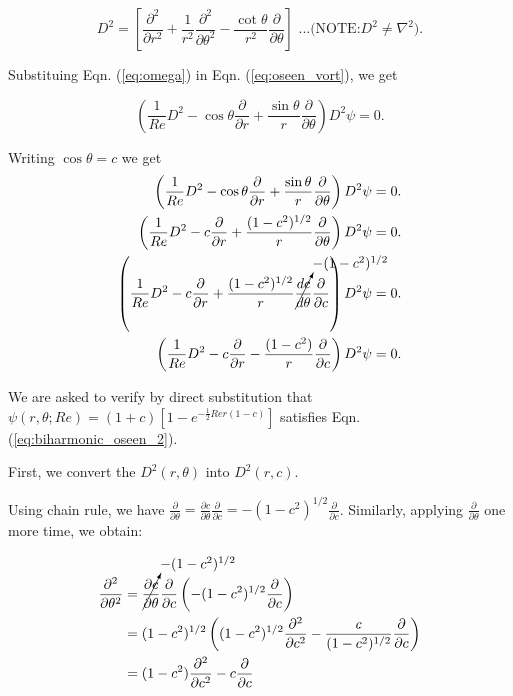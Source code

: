 \documentclass{article}
\begin{document}
\begin{equation}\label{eq:Dsq}
 D^{2} = \left[\frac{\partial^{2} }{\partial r^{2}} + \frac{1}{r^{2}}\frac{\partial^{2}}{\partial \theta^{2}} - \frac{\cot{\theta}}{r^{2}}\frac{\partial}{\partial \theta} \right]\textrm{ ...(NOTE:} D^{2}\neq\nabla^{2}).
\end{equation}

Substituing Eqn. (\ref{eq:omega}) in Eqn. (\ref{eq:oseen_vort}), we get

\begin{equation}\label{eq:biharmonic_oseen_1}
 \left(\frac{1}{Re}D^{2} - \cos{\theta}\frac{\partial }{\partial r} + \frac{\sin \theta}{r}\frac{\partial }{\partial \theta}\right)D^{2}\psi = 0.
\end{equation}

Writing $\cos{\theta} = c$ we get
\begin{align}\label{eq:biharmonic_oseen_2}
 \begin{split}
  \left(\frac{1}{Re}D^{2} - \cos{\theta}\frac{\partial }{\partial r} + \frac{\sin \theta}{r}\frac{\partial }{\partial \theta}\right)D^{2}\psi &= 0.\\
  \left(\frac{1}{Re}D^{2} - c \frac{\partial }{\partial r} + \frac{(1-c^{2})^{1/2}}{r}\frac{\partial }{\partial \theta}\right)D^{2}\psi &= 0.\\
  \left(\frac{1}{Re}D^{2} - c \frac{\partial }{\partial r} + \frac{(1-c^{2})^{1/2}}{r}\cancelto{-(1-c^{2})^{1/2}}{\frac{dc}{d\theta}}\frac{\partial }{\partial c}\right)D^{2}\psi &= 0.\\
  \left(\frac{1}{Re}D^{2} - c \frac{\partial }{\partial r} - \frac{(1-c^{2})}{r}\frac{\partial }{\partial c}\right)D^{2}\psi &= 0.\\
 \end{split}
\end{align}

We are asked to verify by direct substitution that $\psi(r, \theta; Re) = (1+c)[1 - e^{-\frac{1}{2} Re r(1-c)}]$ satisfies Eqn. (\ref{eq:biharmonic_oseen_2}).

First, we convert the $D^{2}(r, \theta)$ into $D^{2}(r, c)$. 

Using chain rule, we have $\frac{\partial }{\partial \theta} = \frac{\partial c}{\partial \theta}\frac{\partial }{\partial c} = -(1-c^{2})^{1/2}\frac{\partial }{\partial c}$. Similarly, applying $\frac{\partial }{\partial \theta}$ one more time, we obtain:

\begin{align}
 \begin{split}
 \frac{\partial^{2} }{\partial \theta^{2}} &= \cancelto{-(1-c^{2})^{1/2}}{\frac{\partial c}{\partial \theta}} \frac{\partial }{\partial c} \left(-(1-c^{2})^{1/2}\frac{\partial }{\partial c} \right)\\
 &= (1-c^{2})^{1/2}\left( (1-c^{2})^{1/2}\frac{\partial^{2} }{\partial c^{2}} - \frac{c}{(1-c^{2})^{1/2}}\frac{\partial}{\partial c} \right)\\
 &=(1-c^{2})\frac{\partial^{2} }{\partial c^{2}} - c\frac{\partial}{\partial c}
 \end{split}
\end{align}
\end{document}
